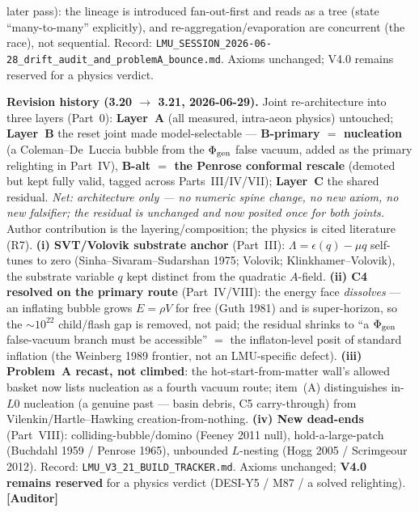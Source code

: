 \documentclass[11pt]{article}
\newcommand{\Auditor}{\textbf{\textcolor{teal!55!black}{[Auditor]}}}
\begin{document}
{later pass): the lineage is introduced fan-out-first and reads as a tree (state ``many-to-many'' explicitly), and re-aggregation/evaporation are concurrent (the race), not sequential. Record: \texttt{LMU\_SESSION\_2026-06-28\_drift\_audit\_and\_problemA\_bounce.md}. Axioms unchanged; V4.0 remains reserved for a physics verdict.

\smallskip\noindent\textbf{Revision history (3.20 $\to$ 3.21, 2026-06-29).} Joint re-architecture into three layers (Part~0): \textbf{Layer~A} (all measured, intra-aeon physics) untouched; \textbf{Layer~B} the reset joint made model-selectable --- \textbf{B-primary $=$ nucleation} (a Coleman--De~Luccia bubble from the $\Phi_{\rm gen}$ false vacuum, added as the primary relighting in Part~IV), \textbf{B-alt $=$ the Penrose conformal rescale} (demoted but kept fully valid, tagged across Parts~III/IV/VII); \textbf{Layer~C} the shared residual. \emph{Net: architecture only --- no numeric spine change, no new axiom, no new falsifier; the residual is unchanged and now posited once for both joints.} Author contribution is the layering/composition; the physics is cited literature (R7). \textbf{(i) SVT/Volovik substrate anchor} (Part~III): $\Lambda=\epsilon(q)-\mu q$ self-tunes to zero (Sinha--Sivaram--Sudarshan 1975; Volovik; Klinkhamer--Volovik), the substrate variable $q$ kept distinct from the quadratic $A$-field. \textbf{(ii) C4 resolved on the primary route} (Part~IV/VIII): the energy face \emph{dissolves} --- an inflating bubble grows $E=\rho V$ for free (Guth 1981) and is super-horizon, so the $\sim\!10^{22}$ child/flash gap is removed, not paid; the residual shrinks to ``a $\Phi_{\rm gen}$ false-vacuum branch must be accessible'' $=$ the inflaton-level posit of standard inflation (the Weinberg 1989 frontier, not an LMU-specific defect). \textbf{(iii) Problem~A recast, not climbed}: the hot-start-from-matter wall's allowed basket now lists nucleation as a fourth vacuum route; item~(A) distinguishes in-$L0$ nucleation (a genuine past --- basin debris, C5 carry-through) from Vilenkin/Hartle--Hawking creation-from-nothing. \textbf{(iv) New dead-ends} (Part~VIII): colliding-bubble/domino (Feeney 2011 null), hold-a-large-patch (Buchdahl 1959 / Penrose 1965), unbounded $L$-nesting (Hogg 2005 / Scrimgeour 2012). Record: \texttt{LMU\_V3\_21\_BUILD\_TRACKER.md}. Axioms unchanged; \textbf{V4.0 remains reserved} for a physics verdict (DESI-Y5 / M87 / a solved relighting). \Auditor

}
\end{document}
